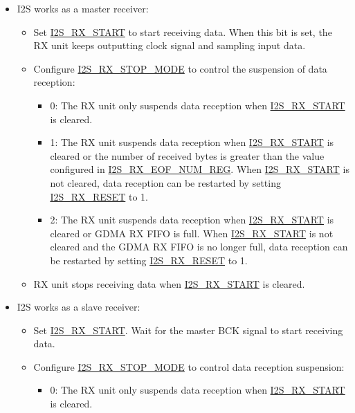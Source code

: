 \documentclass[main\_\_EN.tex]{subfiles}
\begin{document}
\begin{itemize}
    \item I2S works as a master receiver:
    \begin{itemize}
        \item Set \hyperref[fielddesc:I2SRXSTART]{I2S\_RX\_START} to start receiving data. When this bit is set, the RX unit keeps outputting clock signal and sampling input data.
        \item Configure \hyperref[fielddesc:I2SRXSTOPMODE]{I2S\_RX\_STOP\_MODE} to control the suspension of data reception:
        \begin{itemize}
            \item 0: The RX unit only suspends data reception when \hyperref[fielddesc:I2SRXSTART]{I2S\_RX\_START} is cleared.
            \item 1: The RX unit suspends data reception when \hyperref[fielddesc:I2SRXSTART]{I2S\_RX\_START} is cleared or the number of received bytes is greater than the value configured in \hyperref[regdesc:I2SRXEOFNUMREG]{I2S\_RX\_EOF\_NUM\_REG}. When \hyperref[fielddesc:I2SRXSTART]{I2S\_RX\_START} is not cleared, data reception can be restarted by setting \hyperref[fielddesc:I2SRXRESET]{I2S\_RX\_RESET} to 1.
            \item 2: The RX unit suspends data reception when \hyperref[fielddesc:I2SRXSTART]{I2S\_RX\_START} is cleared or GDMA RX FIFO is full. When \hyperref[fielddesc:I2SRXSTART]{I2S\_RX\_START} is not cleared and the GDMA RX FIFO is no longer full, data reception can be restarted by setting \hyperref[fielddesc:I2SRXRESET]{I2S\_RX\_RESET} to 1.
        \end{itemize}
        \item RX unit stops receiving data when \hyperref[fielddesc:I2SRXSTART]{I2S\_RX\_START} is cleared.
    \end{itemize}
    \item I2S works as a slave receiver:
    \begin{itemize}
        \item Set \hyperref[fielddesc:I2SRXSTART]{I2S\_RX\_START}. Wait for the master BCK signal to start receiving data.
        \item Configure \hyperref[fielddesc:I2SRXSTOPMODE]{I2S\_RX\_STOP\_MODE} to control data reception suspension:
        \begin{itemize}
            \item 0: The RX unit only suspends data reception when \hyperref[fielddesc:I2SRXSTART]{I2S\_RX\_START} is cleared.

\end{itemize}
\end{itemize}
\end{itemize}
\end{document}
